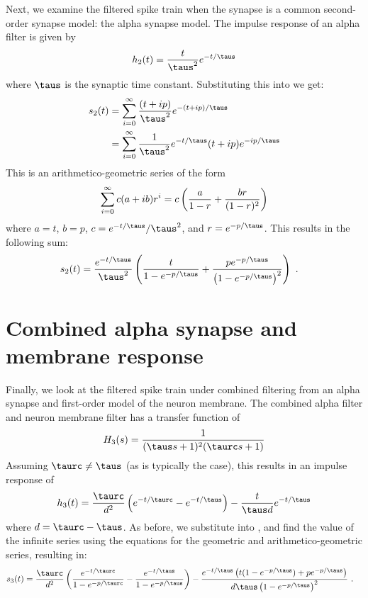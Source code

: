 \begin{appendices}
Next, we examine the filtered spike train
when the synapse is a common second-order synapse model: the alpha synapse model.
The impulse response of an alpha filter is given by
\begin{align}
  h_2(t) = \frac{t}{\taus^2} e^{-t / \taus}
\end{align}
where $\taus$ is the synaptic time constant.
Substituting this into  we get:
\begin{align}
  s_2(t) &= \sum\limits_{i=0}^\infty \frac{(t + ip)}{\taus^2} e^{-(t + ip) / \taus} \\
         &= \sum\limits_{i=0}^\infty \frac{1}{\taus^2} e^{-t/\taus} (t + ip) e^{-ip/\taus}
\end{align}
This is an arithmetico-geometric series of the form
\begin{align}
  \sum\limits_{i=0}^\infty c (a + ib) r^i
  = c\left( \frac{a}{1 - r} + \frac{br}{(1 - r)^2} \right)
  \eqnlabel{arithmetico-geometric}
\end{align}
where $a = t$, $b = p$, $c = e^{-t / \taus} / \taus^2$, and $r = e^{-p / \taus}$.
This results in the following sum:
\begin{align}
  s_2(t) &= \frac{e^{-t/\taus}}{\taus^2} \left(
    \frac{t}{1 - e^{-p/\taus}} + \frac{p e^{-p/\taus}}{\left(1 - e^{-p/\taus}\right)^2} \right) \text{ .}
  \eqnlabel{alpha-series}
\end{align}


\section{Combined alpha synapse and membrane response}

Finally, we look at the filtered spike train under
combined filtering from an alpha synapse and first-order model of the neuron membrane.
The combined alpha filter and neuron membrane filter
has a transfer function of
\begin{align}
  H_3(s) = \frac{1}{(\taus s + 1)^2 (\taurc s + 1)}
\end{align}
Assuming $\taurc \neq \taus$ (as is typically the case),
this results in an impulse response of
\begin{align}
  h_3(t) = \frac{\taurc}{d^2} \left(e^{-t/\taurc} - e^{-t/\taus}\right)
    - \frac{t}{\taus d} e^{-t/\taus}
\end{align}
where $d = \taurc - \taus$.
As before, we substitute into ,
and find the value of the infinite series
using the equations for the geometric and arithmetico-geometric series,
resulting in:
\begin{align}
  s_3(t) &= \frac{\taurc}{d^2}\left(
    \frac{e^{-t/\taurc}}{1 - e^{-p/\taurc}} - \frac{e^{-t/\taus}}{1 - e^{-p/\taus}}\right)
  - \frac{e^{-t/\taus} \left(t (1 - e^{-p/\taus}) + p e^{-p/\taus}\right)}
         {d \taus \left(1 - e^{-p/\taus}\right)^2} \text{ .}
  \eqnlabel{alpharc-series}
\end{align}



\end{appendices}
